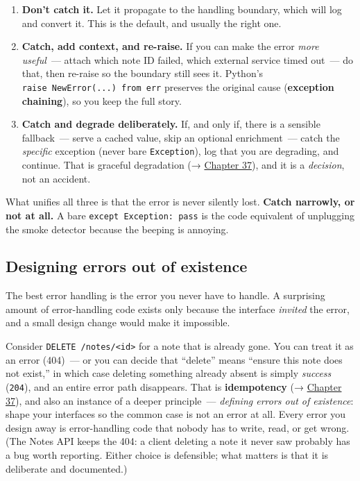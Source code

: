 \begin{enumerate}
\def\labelenumi{\arabic{enumi}.}
\tightlist
\item
  \textbf{Don't catch it.} Let it propagate to the handling boundary, which will log and convert it. This is the default, and usually the right one.
\item
  \textbf{Catch, add context, and re-raise.} If you can make the error \emph{more useful}~--- attach which note ID failed, which external service timed out~--- do that, then re-raise so the boundary still sees it. Python's \texttt{raise\ NewError(.}\allowbreak{}\texttt{.}\allowbreak{}\texttt{.}\allowbreak{}\texttt{)\ from\ err} preserves the original cause (\textbf{exception chaining}), so you keep the full story.
\item
  \textbf{Catch and degrade deliberately.} If, and only if, there is a sensible fallback~--- serve a cached value, skip an optional enrichment~--- catch the \emph{specific} exception (never bare \texttt{Exception}), log that you are degrading, and continue. That is graceful degradation (→ \hyperref[ch:37-reliability]{Chapter 37}), and it is a \emph{decision}, not an accident.
\end{enumerate}

\noindent{}What unifies all three is that the error is never silently lost. \textbf{Catch narrowly, or not at all.} A bare \texttt{except\ Exception:\ pass} is the code equivalent of unplugging the smoke detector because the beeping is annoying.

\subsection*{Designing errors out of existence}\label{16-logging-error-handling:designing-errors-out-of-existence}

The best error handling is the error you never have to handle. A surprising amount of error-handling code exists only because the interface \emph{invited} the error, and a small design change would make it impossible.

Consider \texttt{DELETE\ /}\allowbreak{}\texttt{notes/}\allowbreak{}\texttt{\textless{}id\textgreater{}} for a note that is already gone. You can treat it as an error (404)~--- or you can decide that ``delete'' means ``ensure this note does not exist,'' in which case deleting something already absent is simply \emph{success} (\texttt{204}), and an entire error path disappears. That is \textbf{idempotency} (→ \hyperref[ch:37-reliability]{Chapter 37}), and also an instance of a deeper principle~--- \emph{defining errors out of existence}: shape your interfaces so the common case is not an error at all. Every error you design away is error-handling code that nobody has to write, read, or get wrong. (The Notes API keeps the 404: a client deleting a note it never saw probably has a bug worth reporting. Either choice is defensible; what matters is that it is deliberate and documented.)

